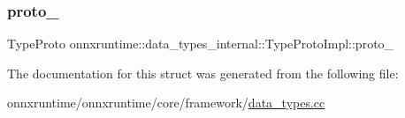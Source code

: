 \subsubsection{\texorpdfstring{proto\+\_\+}{proto\_}}
{\footnotesize\ttfamily Type\+Proto onnxruntime\+::data\+\_\+types\+\_\+internal\+::\+Type\+Proto\+Impl\+::proto\+\_\+}



The documentation for this struct was generated from the following file\+:\begin{DoxyCompactItemize}
\item 
onnxruntime/onnxruntime/core/framework/\mbox{\hyperlink{data__types_8cc}{data\+\_\+types.\+cc}}\end{DoxyCompactItemize}
